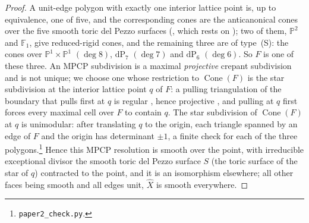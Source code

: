 \documentclass[11pt]{amsart}
\theoremstyle{definition}
\theoremstyle{remark}
\newcommand{\PP}{\mathbb{P}}
\newcommand{\FF}{\mathbb{F}}
\newcommand{\Cone}{\operatorname{Cone}}
\begin{document}
\begin{proof}
A unit-edge polygon with exactly one interior lattice point is, up to
equivalence, one of five, and the corresponding cones are the
anticanonical cones over the five smooth toric del Pezzo
surfaces (\cite[Rem.~2.6]{paper1}, which rests on
\cite[\S5.5]{Gross97}); two of them, $\PP^2$ and $\FF_1$, give reduced-rigid cones, and the remaining
three are of type~(S): the cones over $\PP^1\times\PP^1$ $(\deg 8)$,
$\mathrm{dP}_7$ $(\deg 7)$ and $\mathrm{dP}_6$ $(\deg 6)$.  So $F$ is
one of these three.  An MPCP subdivision is a maximal \emph{projective}
crepant subdivision and is not unique; we choose one whose restriction
to $\Cone(F)$ is the star subdivision at the interior lattice point $q$
of $F$: a pulling triangulation of the boundary that pulls first at $q$
is regular \cite[\S4.3]{DLRS}, hence projective \cite[Ch.~15]{CLS}, and
pulling at $q$ first forces every maximal cell over $F$ to contain $q$.  The star
subdivision of $\Cone(F)$ at $q$ is unimodular: after translating $q$ to
the origin, each triangle spanned by an edge of $F$ and the origin has
determinant $\pm1$, a finite check for each of the three
polygons.\footnote{\texttt{paper2\_check.py}.}  Hence this MPCP resolution is smooth over
the point, with irreducible exceptional divisor the smooth toric del
Pezzo surface $S$ (the toric surface of the star of $q$) contracted to
the point, and it is an isomorphism elsewhere;
all other faces being smooth and all edges unit, $\widehat X$ is smooth
everywhere.


\end{proof}
\end{document}
